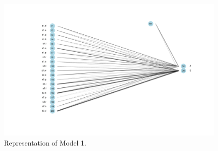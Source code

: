 \begin{figure}
  \includegraphics[scale=0.45]{./figures/fake/model1.pdf}
  \caption{Representation of Model 1.}\label{fig:model1}
\end{figure}

